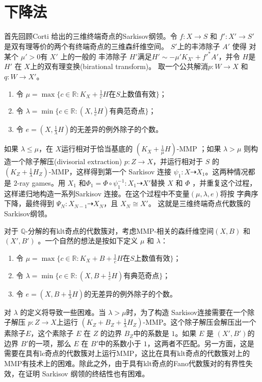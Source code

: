 \section{下降法}
首先回顾Corti \cite{cortiFactoringBirationalMaps} 给出的三维终端奇点的Sarkisov纲领。令 $f: X\to S$ 和 $f':X'\to S'$ 是双有理等价的两个有终端奇点的三维森纤维空间。
 $S'$上的丰沛除子 $A'$ 使得 对某个 $\mu'>0$有 $X'$ 上的一般的 丰沛除子 $H'$满足$H'\sim -\mu'K_{X'}+f'^*A'$，并令 $H$是  $H'$ 在 $X$上的双有理变换(birational transform)。 取一个公共解消$p: W\to X$ 和 $q:W \to X'$。
\begin{enumerate}
  \item 令 $\mu= \max \{c \in \mathbb{R} : K_{X}+\frac{1}{c}H \text{在} S \text{上数值有效} \}$；
  \item 令 $\lambda = \min \{c\in \mathbb{R}: (X,\frac{1}{c}H) \text{有典范奇点}  \}$；
  \item 令 $e =  (X,\frac{1}{\lambda}H)\text{的无差异的例外除子的个数} $。
\end{enumerate}
如果 $\lambda \leqslant \mu$，在 $X$运行相对于恰当基底的 $(K_X+\frac{1}{\mu}H)$-MMP ；如果 $\lambda > \mu$ 则构造一个除子解压(divisorial extraction) $ p:Z \to X$，并运行相对于 $ S$ 的 $(K_Z+\frac{1}{\lambda}H_Z)$-MMP，这样得到第一个 Sarkisov 连接 $\psi_1: X\dashrightarrow  X_{1}$。这两种情况都是 $2$-ray games。用 $X_{1}$ 和$\Phi_{1}=\Phi\circ\psi_1^{-1}: X_1\dashrightarrow X'$替换 $X$ 和 $\Phi$ ，并重复这个过程，这样递归地构造一系列Sarkisov 连接。在这个过程中不变量$(\mu,\lambda,e)$将按 字典序下降，最终得到 $\Psi_{N}:X_{N-1} \dashrightarrow X_{N}$，且 $X_{N}\cong X'$。 这就是三维终端奇点代数簇的Sarkisov纲领。

对于 $\mathbb{Q}$-分解的有klt奇点的代数簇对，考虑MMP-相关的森纤维空间$(X,B)$ 和 $(X',B')$ 。一个自然的想法是按如下定义 $\mu$ 和 $\lambda$：
\begin{enumerate}
  \item 令 $\mu= \max \{c \in \mathbb{R} : K_{X}+B+\frac{1}{c}H \text{在} S \text{上数值有效} \}$；
  \item 令 $\lambda = \min \{c\in \mathbb{R}: (X,B+\frac{1}{c}H) \text{有典范奇点}  \}$；
  \item 令 $e =  (X,B+\frac{1}{\lambda}H)\text{的无差异的例外除子的个数} $。
\end{enumerate}

对 $\lambda$ 的定义将导致一些困难。当 $\lambda > \mu$时，为了构造 Sarkisov连接需要在一个除子解压 $p:Z \to X$上运行 $(K_Z+B_Z+\frac{1}{\lambda}H_Z)$-MMP。这个除子解压会解压出一个素除子$E$，这个素除子 $E$ 在 $Z$ 的边界  $B_Z$中的系数是 $1$。如果 $E$ 是 $(X',B')$的边界 $B'$的一项，那么 $E$ 在 $B'$中的系数小于 $1$，这两者不匹配。另一方面，这是需要在具有lc奇点的代数簇对上运行MMP，这比在具有klt奇点的代数簇对上的MMP有技术上的困难。除此之外，由于具有klt奇点的Fano代数簇对的有界性失效，在证明 Sarkisov 纲领的终结性也有困难。

